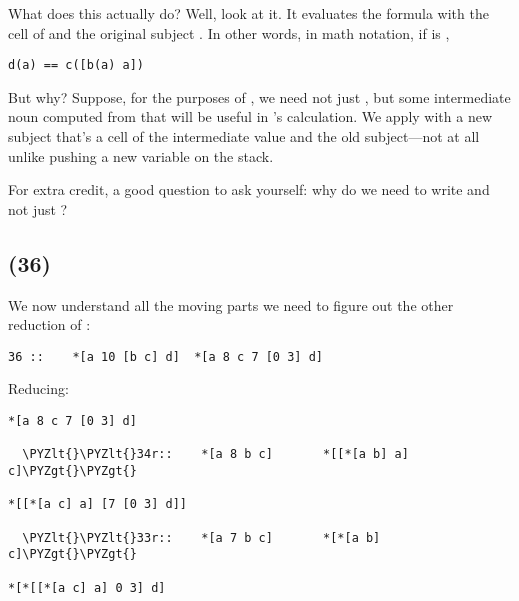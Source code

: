 What does this actually do?  Well, look at it.  It evaluates the
formula  with the cell of \kode{*[a b]} and the original subject
.  In other words, in math notation, if  is \kode{[8 b c]},

\begin{framed_shaded}
\begin{Verbatim}[fontsize=\relsize{-2.5},fontseries=b,commandchars=\\\{\}]
d(a) == c([b(a) a])
\end{Verbatim}
\end{framed_shaded}

But why?  Suppose, for the purposes of , we need not just ,
but some intermediate noun computed from  that will be useful
in 's calculation.  We apply  with a new subject that's a
cell of the intermediate value and the old subject---not at all
unlike pushing a new variable on the stack.

For extra credit, a good question to ask yourself: why do we
need to write \kode{[7 [0 1] b]} and not just ?

\subsection{ (36)}

We now understand all the moving parts we need to figure out the
other reduction of :

\begin{framed_shaded}
\begin{Verbatim}[fontsize=\relsize{-2.5},fontseries=b,commandchars=\\\{\}]
36 ::    *[a 10 [b c] d]  *[a 8 c 7 [0 3] d]
\end{Verbatim}
\end{framed_shaded}

Reducing:

\begin{framed_shaded}
\begin{Verbatim}[fontsize=\relsize{-2.5},fontseries=b,commandchars=\\\{\}]
*[a 8 c 7 [0 3] d]

  \PYZlt{}\PYZlt{}34r::    *[a 8 b c]       *[[*[a b] a] c]\PYZgt{}\PYZgt{}

*[[*[a c] a] [7 [0 3] d]]

  \PYZlt{}\PYZlt{}33r::    *[a 7 b c]       *[*[a b] c]\PYZgt{}\PYZgt{}

*[*[[*[a c] a] 0 3] d]
\end{Verbatim}
\end{framed_shaded}

